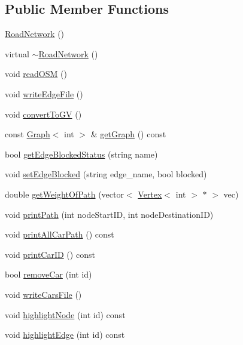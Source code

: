 \subsection*{Public Member Functions}
\begin{DoxyCompactItemize}
\item 
\hyperlink{classRoadNetwork_a635cd53a27194c18870f6afc1f9e54cf}{Road\+Network} ()
\item 
virtual \hyperlink{classRoadNetwork_a03a442c7c5c89bab9bb10632caefd2eb}{$\sim$\+Road\+Network} ()
\item 
void \hyperlink{classRoadNetwork_abf74962fc6a63d82efcd0073c48b0d35}{read\+O\+SM} ()
\item 
void \hyperlink{classRoadNetwork_a8b2c18eac996760101db4afc6c114b14}{write\+Edge\+File} ()
\item 
void \hyperlink{classRoadNetwork_a280633c5b00df3dfc59bc677fc12daa3}{convert\+To\+GV} ()
\item 
const \hyperlink{classGraph}{Graph}$<$ int $>$ \& \hyperlink{classRoadNetwork_a64106d7ec4e6b2953197b617fe0630bf}{get\+Graph} () const 
\item 
bool \hyperlink{classRoadNetwork_a60e0a20c8e393740c81fa47bc42bf9cd}{get\+Edge\+Blocked\+Status} (string name)
\item 
void \hyperlink{classRoadNetwork_a981b13a5dcab7fb5a1089d0a53fc788d}{set\+Edge\+Blocked} (string edge\+\_\+name, bool blocked)
\item 
double \hyperlink{classRoadNetwork_aa443cb868d60554dbec1b72c009c13ab}{get\+Weight\+Of\+Path} (vector$<$ \hyperlink{classVertex}{Vertex}$<$ int $>$ $\ast$ $>$ vec)
\item 
void \hyperlink{classRoadNetwork_ae48e55423eb4341d38634ecaa2c5f928}{print\+Path} (int node\+Start\+ID, int node\+Destination\+ID)
\item 
void \hyperlink{classRoadNetwork_af205756860697944d8f37490dd0b9e35}{print\+All\+Car\+Path} () const 
\item 
void \hyperlink{classRoadNetwork_ac4badf08e6ff3cfaff7e6e3a3f9efc3f}{print\+Car\+ID} () const 
\item 
bool \hyperlink{classRoadNetwork_a47cedd456d5f101e2759237f65bb0ff1}{remove\+Car} (int id)
\item 
void \hyperlink{classRoadNetwork_ac84b2b00026bff9f86b176eeea850c85}{write\+Cars\+File} ()
\item 
void \hyperlink{classRoadNetwork_aaac7323e85fb420874c33f43cf86c298}{highlight\+Node} (int id) const 
\item 
void \hyperlink{classRoadNetwork_ac25e6fa1448a8d04b7ca66fcf7a75a07}{highlight\+Edge} (int id) const 

\end{DoxyCompactItemize}
